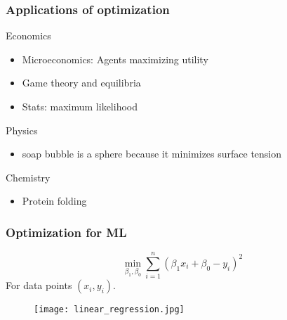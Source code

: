 \documentclass{beamer}
\begin{document}
\begin{frame}
  \frametitle{Applications of optimization}

  Economics
  \begin{itemize}
    \item Microeconomics: Agents maximizing utility
    \item Game theory and equilibria
    \item Stats: maximum likelihood
  \end{itemize}
  Physics
  \begin{itemize}
    \item soap bubble is a sphere because it minimizes surface tension
  \end{itemize}
  Chemistry
  \begin{itemize}
    \item Protein folding
  \end{itemize}

\end{frame}

\begin{frame}
  \frametitle{Optimization for ML}
  \begin{minipage}{0.5\textwidth}
    \begin{equation}
      \min_{\beta_1, \beta_0} \sum_{i=1}^{n} {( \beta_1 x_i + \beta_0 - y_i)}^2
    \end{equation}
    For data points $(x_i, y_i)$.
  \end{minipage}
  \hfill
  \begin{minipage}{0.45\textwidth}
    \begin{figure}[ht]
      \centering
      \texttt{[image: linear\_regression.jpg]}
    \end{figure}

  \end{minipage}


\end{frame}
\end{document}
